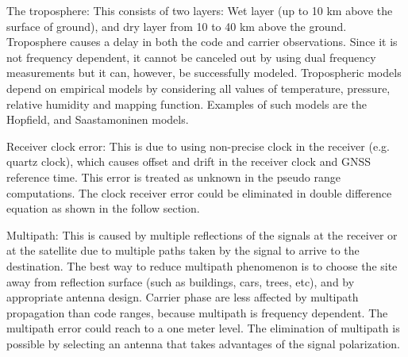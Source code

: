 The troposphere: This consists of two layers: Wet layer (up to 10 km above the surface of
ground), and dry layer from 10 to 40 km above the ground. Troposphere causes a delay in both
the code and carrier observations. Since it is not frequency dependent, it cannot be canceled out
by using dual frequency measurements but it can, however, be successfully modeled.
Tropospheric models depend on empirical models by considering all values of temperature,
pressure, relative humidity and mapping function. Examples of such models are the Hopfield,
and Saastamoninen models.

Receiver clock error: This is due to using non-precise clock in the receiver (e.g. quartz clock),
which causes offset and drift in the receiver clock and GNSS reference time. This error is treated
as unknown in the pseudo range computations. The clock receiver error could be eliminated in
double difference equation as shown in the follow section.

Multipath: This is caused by multiple reflections of the signals at the receiver or at the satellite
due to multiple paths taken by the signal to arrive to the destination. The best way to reduce
multipath phenomenon is to choose the site away from reflection surface (such as buildings, cars,
trees, etc), and by appropriate antenna design. Carrier phase are less affected by multipath
propagation than code ranges, because multipath is frequency dependent. The multipath error
could reach to a one meter level. The elimination of multipath is possible by selecting an antenna
that takes advantages of the signal polarization.

